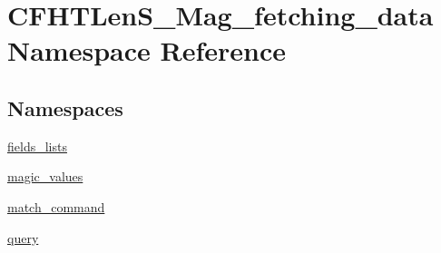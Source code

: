 \hypertarget{namespaceCFHTLenS__Mag__fetching__data}{}\section{C\+F\+H\+T\+Len\+S\+\_\+\+Mag\+\_\+fetching\+\_\+data Namespace Reference}
\label{namespaceCFHTLenS__Mag__fetching__data}
\subsection*{Namespaces}
\begin{DoxyCompactItemize}
\item 
 \hyperlink{namespaceCFHTLenS__Mag__fetching__data_1_1fields__lists}{fields\+\_\+lists}
\item 
 \hyperlink{namespaceCFHTLenS__Mag__fetching__data_1_1magic__values}{magic\+\_\+values}
\item 
 \hyperlink{namespaceCFHTLenS__Mag__fetching__data_1_1match__command}{match\+\_\+command}
\item 
 \hyperlink{namespaceCFHTLenS__Mag__fetching__data_1_1query}{query}
\end{DoxyCompactItemize}
